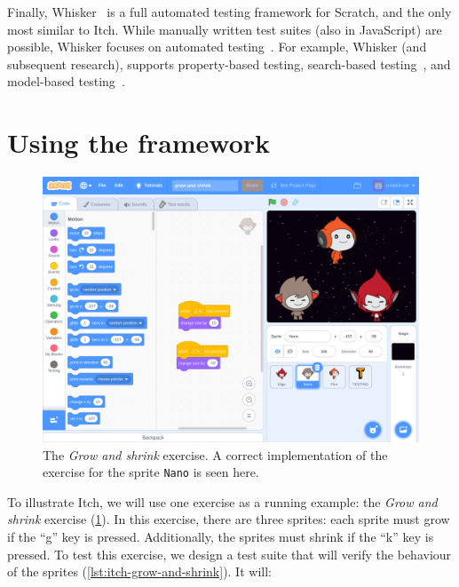 \documentclass[../main]{subfiles}
\begin{document}
Finally, Whisker~\autocite{stahlbauerTestingScratchPrograms2019} is a full automated testing framework for Scratch, and the only most similar to Itch.
While manually written test suites (also in JavaScript) are possible, Whisker focuses on automated testing~\autocite{deinerAutomatedTestGeneration2023}.
For example, Whisker (and subsequent research), supports property-based testing, search-based testing~\autocite{deinerSearchBasedTestingScratch2020}, and model-based testing~\autocite{gotzModelbasedTestingScratch2022}.

\section{Using the framework}\label{sec:itch-using-the-framework}

\begin{figure}
    \begin{wide}
        \includegraphics[width=\linewidth]{itch-grow-and-shrink-code}
    \end{wide}
    \caption{
        The \emph{Grow and shrink} exercise.
        A correct implementation of the exercise for the sprite \texttt{Nano} is seen here.
    }
    \label{fig:itch-grow-shrink-code}
\end{figure}

To illustrate Itch, we will use one exercise as a running example: the \emph{Grow and shrink} exercise (\cref{fig:itch-grow-shrink-code}).
In this exercise, there are three sprites: each sprite must grow if the ``g'' key is pressed.
Additionally, the sprites must shrink if the ``k'' key is pressed.
To test this exercise, we design a test suite that will verify the behaviour of the sprites (\cref{lst:itch-grow-and-shrink}).
It will:
\end{document}
